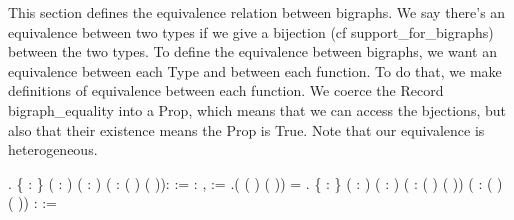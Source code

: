 \documentclass[12pt]{report}
\begin{document}
This section defines the equivalence relation between bigraphs. 
We say there's an equivalence between two types if we give a bijection 
(cf support\_for\_bigraphs) between the two types. To define the equivalence 
between bigraphs, we want an equivalence between each Type and between 
each function.
To do that, we make definitions of equivalence between each function. 
We coerce the Record bigraph\_equality into a Prop, which means that we can
access the bjections, but also that their existence means the Prop is True.
Note that our equivalence is heterogeneous. \begin{coqdoccode}
\coqdocnoindent
{} .\coqdoceol
\coqdocindent{1.00em}
  \{        : \} \coqdoceol
\coqdocindent{2.00em}
( :     ) ( :     )\coqdoceol
\coqdocindent{2.00em}
( :  ( ) ( )):  :=\coqdoceol
\coqdocindent{3.00em}
\coqdockw{\ensuremath{\forall}} : ,   := .( ( ) ( ))   \coqdoceol
\coqdocindent{3.00em}
   =   .\coqdoceol
\coqdocemptyline
\coqdocindent{1.00em}
  \{        : \} \coqdoceol
\coqdocindent{2.00em}
( :     ) ( :     )\coqdoceol
\coqdocindent{2.00em}
( :  ( ) ( ))\coqdoceol
\coqdocindent{2.00em}
( :  ( ) ( )) :  :=\coqdoceol

\end{coqdoccode}
\end{document}
